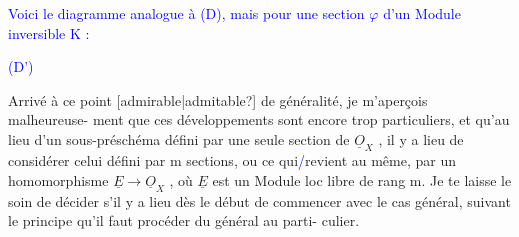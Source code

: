 \documentclass[11pt]{article}
\newcommand{\scanpage}[1]{\par\bigskip\noindent{\small\sffamily[scan #1]}\par}
\newcommand{\mspage}[1]{{\small\sffamily[p.\,#1]}}
\newcommand{\hand}[1]{\textcolor{blue}{#1}}
\newcommand{\unsure}[1]{[#1?]}
\newenvironment{diagramblock}{\par\begin{center}}{\end{center}\par}
\begin{document}
\hand{Voici le diagramme analogue à (D), mais pour}
\hand{une section $\varphi$ d'un Module inversible K :}

\hand{(D')}
\begin{diagramblock}
\end{diagramblock}

\mspage{\hand{148}}

\clearpage
\scanpage{25/149}
\mspage{10}

Arrivé à ce point \unsure{admirable|admitable} de généralité, je m'aperçois malheureuse-%
ment que ces développements sont encore trop particuliers, et qu'au lieu
d'un sous-préschéma défini par une seule section de $\underline{O}_X$ , il y a lieu de
considérer celui défini par m sections, ou ce qui\hand{/}revient au même, par un
homomorphisme $\underline{E} \longrightarrow \underline{O}_X$ , où $\underline{E}$ est un Module loc libre de rang m. Je te
laisse le soin de décider s'il y a lieu dès le début de commencer avec le
cas général, suivant le principe qu'il faut procéder du général au parti-%
culier.
\end{document}

